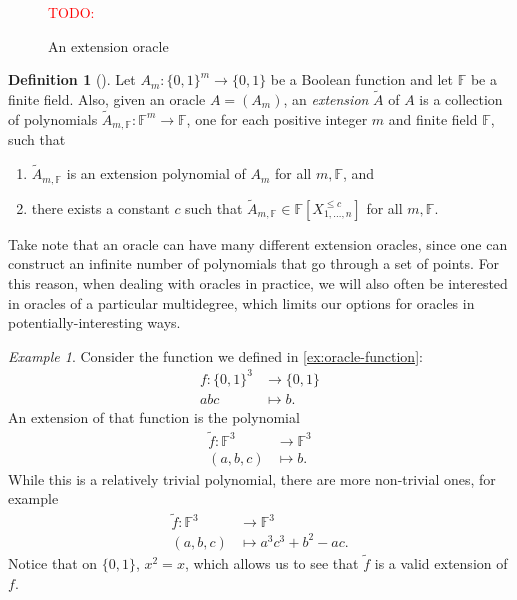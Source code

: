 \documentclass[english,12pt]{reedthesis}
\theoremstyle{plain}
\theoremstyle{definition}
\newtheorem{defn}[defn]{Definition}
\theoremstyle{remark}
\newtheorem{example}{Example}[thm]
\newcommand{\TODO}[1]{\textcolor{red}{TODO: #1}}
\begin{document}
\begin{figure}[htbp]
  \TODO{}
  \caption{An extension oracle}\label{fig:ext-oracle}
\end{figure}

\begin{defn}[{\cite[Def.\ 2.2]{AW09}}]\label{def:ext-oracle}
  Let $A_{m}\colon \{0, 1\}^{m} \rightarrow \{0, 1\}$ be a Boolean function and let
  $\mathbb{F}$ be a finite field. Also, given an oracle $A = (A_{m})$, an
  \emph{extension} $\tilde{A}$ of $A$ is a collection of polynomials
  $\tilde{A}_{m,\mathbb{F}}\colon \mathbb{F}^{m} \rightarrow \mathbb{F}$, one for each
  positive integer $m$ and finite field $\mathbb{F}$, such that
  \begin{enumerate}
    \item $\tilde{A}_{m,\mathbb{F}}$ is an extension polynomial of $A_{m}$ for
          all $m,\mathbb{F}$, and
    \item there exists a constant $c$ such that
          $\tilde{A}_{m,\mathbb{F}} \in \mathbb{F}[X_{1, \ldots, n}^{\le c}]$ for all
          $m, \mathbb{F}$.
  \end{enumerate}
\end{defn}

Take note that an oracle can have many different extension oracles, since one
can construct an infinite number of polynomials that go through a set of points.
For this reason, when dealing with oracles in practice, we will also often be
interested in oracles of a particular multidegree, which limits our options for
oracles in potentially-interesting ways.

\begin{example}\label{ex:oracle-function-ext}
  Consider the function we defined in \cref{ex:oracle-function}:
  \begin{equation}
    \begin{aligned}
      f\colon \{0, 1\}^{3} &\rightarrow \{0, 1\} \\
      abc &\mapsto b.
    \end{aligned}
  \end{equation}
  An extension of that function is the polynomial
  \begin{equation}
    \begin{aligned}
      \tilde{f}\colon \mathbb{F}^{3} &\rightarrow \mathbb{F}^{3} \\
      (a,b,c) &\mapsto b.
    \end{aligned}
  \end{equation}
  While this is a relatively trivial polynomial, there are more non-trivial
  ones, for example
  \begin{equation}
    \begin{aligned}
      \tilde{f}\colon \mathbb{F}^{3} &\rightarrow \mathbb{F}^{3} \\
      (a,b,c) &\mapsto a^{3}c^{3} + b^{2} - ac.
    \end{aligned}
  \end{equation}
  Notice that on $\{0, 1\}$, $x^{2} = x$, which allows us to see that
  $\tilde{f}$ is a valid extension of $f$.
\end{example}
\end{document}
